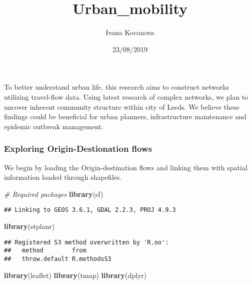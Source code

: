 \documentclass[]{article}
\title{Urban\_mobility}
\author{Ivana Kocanova}
\date{23/08/2019}
\newenvironment{Shaded}{\begin{snugshade}}{\end{snugshade}}
\newcommand{\CommentTok}[1]{\textcolor[rgb]{0.56,0.35,0.01}{\textit{#1}}}
\newcommand{\KeywordTok}[1]{\textcolor[rgb]{0.13,0.29,0.53}{\textbf{#1}}}
\newcommand{\NormalTok}[1]{#1}
\begin{document}
\maketitle

To better understand urban life, this research aims to construct
networks utilizing travel-flow data. Using latest research of complex
networks, we plan to uncover inherent community structure within city of
Leeds. We believe these findings could be beneficial for urban planners,
infrastructure maintenance and epidemic outbreak management.

\hypertarget{exploring-origin-destionation-flows}{%
\subsubsection{Exploring Origin-Destionation
flows}\label{exploring-origin-destionation-flows}}

We begin by loading the Origin-destination flows and linking them with
spatial information loaded through shapefiles.

\begin{Shaded}
\begin{Highlighting}[]
\CommentTok{# Required packages}
\KeywordTok{library}\NormalTok{(sf)}
\end{Highlighting}
\end{Shaded}

\begin{verbatim}
## Linking to GEOS 3.6.1, GDAL 2.2.3, PROJ 4.9.3
\end{verbatim}

\begin{Shaded}
\begin{Highlighting}[]
\KeywordTok{library}\NormalTok{(stplanr)}
\end{Highlighting}
\end{Shaded}

\begin{verbatim}
## Registered S3 method overwritten by 'R.oo':
##   method        from       
##   throw.default R.methodsS3
\end{verbatim}

\begin{Shaded}
\begin{Highlighting}[]
\KeywordTok{library}\NormalTok{(leaflet)}
\KeywordTok{library}\NormalTok{(tmap)}
\KeywordTok{library}\NormalTok{(dplyr)}
\end{Highlighting}
\end{Shaded}
\end{document}
